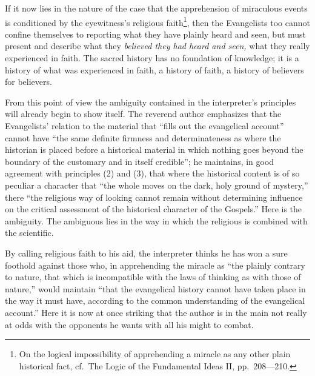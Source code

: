 \documentclass[12pt,a4paper,openany]{book}
\newcommand{\opage}[1]{\marginnote{\footnotesize\textit{[#1]}}}
\begin{document}
If it now lies in the nature of the case that the apprehension of
miraculous events is conditioned by the eyewitness's religious
faith\footnote[1]{On the logical impossibility of apprehending a miracle as any other plain historical fact, cf.\ The Logic of the Fundamental Ideas II, pp.\ 208—210.}, then the Evangelists too cannot
confine themselves to reporting what they have plainly
heard and seen, but must present and describe what they
\emph{believed they had heard and seen,} what they really experienced
in faith. The sacred history has no foundation of knowledge;
it is a history of what was experienced in faith,
a history of faith, a history of believers for believers.

From this point of view the ambiguity contained in the interpreter's
principles will already begin to
show itself. The reverend author emphasizes that
the Evangelists' relation to the material that ``fills out the
evangelical account'' cannot have ``the same definite
firmness and determinateness as where the historian is
placed before a historical material in which nothing goes beyond
the boundary of the customary and in itself credible'';
he maintains, in good agreement with principles
(2) and (3), that where the historical
content is of so peculiar a character that ``the
whole moves on the dark, holy ground of mystery,''
there ``the religious way of looking cannot
remain without determining influence on the critical
assessment of the historical character of the Gospels.'' Here
is the ambiguity. The ambiguous lies in the way
in which the religious is combined with the scientific.

\setcounter{footnote}{0}%
\opage{318}By calling religious faith to his aid, the interpreter
thinks he has won a sure foothold against those
who, in apprehending the miracle as ``the plainly contrary to nature,
that which is incompatible with the laws of thinking as with those of nature,''
would maintain ``that the evangelical
history cannot have taken place in the way it
must have, according to the common understanding of the evangelical
account.'' Here it is now
at once striking that the author is in the main not really
at odds with the opponents he wants with all his might to combat.
\end{document}
